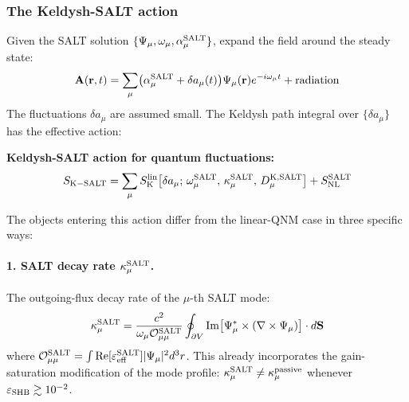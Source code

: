 \documentclass[12pt]{article}
\newcommand{\Keldysh}{{\rm K}}
\begin{document}
\subsubsection*{The Keldysh-SALT action}

Given the SALT solution $\{\Psi_\mu, \omega_\mu, \alpha_\mu^{\rm SALT}\}$,
expand the field around the steady state:
\begin{equation}
  \mathbf{A}(\mathbf{r},t) =
  \sum_\mu\bigl(\alpha_\mu^{\rm SALT}
  + \delta a_\mu(t)\bigr)\Psi_\mu(\mathbf{r})
  e^{-i\omega_\mu t}
  + \text{radiation}
  \label{eq:SALT_expand}
\end{equation}
The fluctuations $\delta a_\mu$ are assumed small.  The Keldysh path
integral over $\{\delta a_\mu\}$ has the effective action:

\begin{keyresult}
\textbf{Keldysh-SALT action for quantum fluctuations:}
\begin{equation}
  S_{\rm K-SALT} =
  \sum_\mu S_\Keldysh^{\rm lin}\bigl[\delta a_\mu;\,
  \omega_\mu^{\rm SALT},\,\kappa_\mu^{\rm SALT},\,
  D^{\Keldysh,\rm SALT}_\mu\bigr]
  + S_{\rm NL}^{\rm SALT}
  \label{eq:SALT_Keldysh_action}
\end{equation}
\end{keyresult}

The objects entering this action differ from the linear-QNM case in
three specific ways:

\paragraph{1. SALT decay rate $\kappa_\mu^{\rm SALT}$.}
The outgoing-flux decay rate of the $\mu$-th SALT mode:
\begin{equation}
  \kappa_\mu^{\rm SALT} =
  \frac{c^2}{\omega_\mu\mathcal{O}_{\mu\mu}^{\rm SALT}}
  \oint_{\partial V}\mathrm{Im}
  \bigl[\Psi_\mu^*\times(\nabla\times\Psi_\mu)\bigr]
  \cdot d\mathbf{S}
  \label{eq:kappa_SALT}
\end{equation}
where $\mathcal{O}_{\mu\mu}^{\rm SALT} = \int\mathrm{Re}
[\varepsilon_{\rm eff}^{\rm SALT}]|\Psi_\mu|^2d^3r$.
This already incorporates the gain-saturation modification of the
mode profile: $\kappa_\mu^{\rm SALT} \neq \kappa_\mu^{\rm passive}$
whenever $\varepsilon_{\rm SHB} \gtrsim 10^{-2}$.
\end{document}
